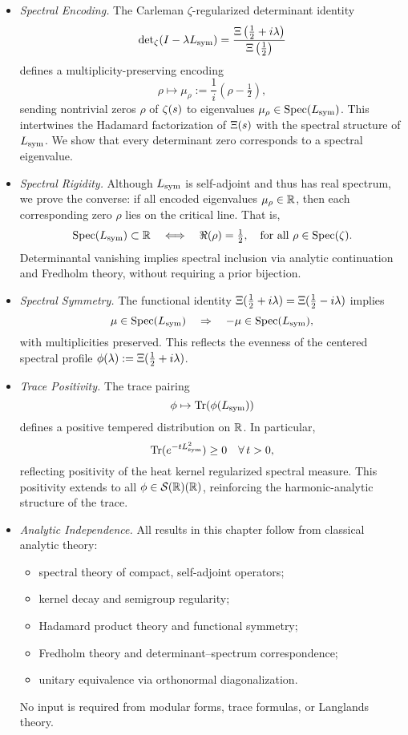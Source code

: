\begin{itemize}
  \item \textit{Spectral Encoding.}  
  The Carleman \(\zeta\)-regularized determinant identity
  \[
  \det\nolimits_{\zeta}(I - \lambda L_{\mathrm{sym}})
  = \frac{\Xi\left(\tfrac{1}{2} + i\lambda\right)}{\Xi\left(\tfrac{1}{2}\right)}
  \]
  defines a multiplicity-preserving encoding
  \[
  \rho \mapsto \mu_\rho := \frac{1}{i}(\rho - \tfrac{1}{2}),
  \]
  sending nontrivial zeros \( \rho \) of \( \zeta(s) \) to eigenvalues \( \mu_\rho \in \operatorname{Spec}(L_{\mathrm{sym}}) \). This intertwines the Hadamard factorization of \( \Xi(s) \) with the spectral structure of \( L_{\mathrm{sym}} \). We show that every determinant zero corresponds to a spectral eigenvalue.

  \item \textit{Spectral Rigidity.}  
  Although \( L_{\mathrm{sym}} \) is self-adjoint and thus has real spectrum, we prove the converse: if all encoded eigenvalues \( \mu_\rho \in \mathbb{R} \), then each corresponding zero \( \rho \) lies on the critical line. That is,
  \[
  \operatorname{Spec}(L_{\mathrm{sym}}) \subset \mathbb{R}
  \quad \Longleftrightarrow \quad
  \Re(\rho) = \tfrac{1}{2}, \quad \text{for all } \rho \in \operatorname{Spec}(\zeta).
  \]
  Determinantal vanishing implies spectral inclusion via analytic continuation and Fredholm theory, without requiring a prior bijection.

  \item \textit{Spectral Symmetry.}  
  The functional identity \( \Xi(\tfrac{1}{2} + i\lambda) = \Xi(\tfrac{1}{2} - i\lambda) \) implies
  \[
  \mu \in \operatorname{Spec}(L_{\mathrm{sym}}) \quad \Rightarrow \quad -\mu \in \operatorname{Spec}(L_{\mathrm{sym}}),
  \]
  with multiplicities preserved. This reflects the evenness of the centered spectral profile \( \phi(\lambda) := \Xi(\tfrac{1}{2} + i\lambda) \).

  \item \textit{Trace Positivity.}  
  The trace pairing
  \[
  \phi \mapsto \operatorname{Tr}(\phi(L_{\mathrm{sym}}))
  \]
  defines a positive tempered distribution on \( \mathbb{R} \). In particular,
  \[
  \operatorname{Tr}(e^{-tL_{\mathrm{sym}}^2}) \ge 0 \quad \forall\, t > 0,
  \]
  reflecting positivity of the heat kernel regularized spectral measure. This positivity extends to all \( \phi \in \mathcal{S}(\mathbb{R})(\mathbb{R}) \), reinforcing the harmonic-analytic structure of the trace.

  \item \textit{Analytic Independence.}  
  All results in this chapter follow from classical analytic theory:
  \begin{itemize}
    \item spectral theory of compact, self-adjoint operators;
    \item kernel decay and semigroup regularity;
    \item Hadamard product theory and functional symmetry;
    \item Fredholm theory and determinant–spectrum correspondence;
    \item unitary equivalence via orthonormal diagonalization.
  \end{itemize}
  No input is required from modular forms, trace formulas, or Langlands theory.
\end{itemize}

